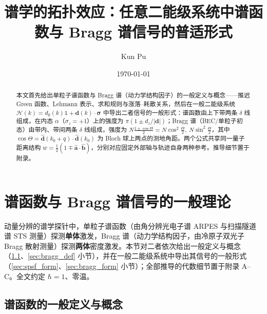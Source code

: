 \documentclass[onecolumn,aps,prl,superscriptaddress,longbibliography]{revtex4-2}
\begin{document}
	

\title{谱学的拓扑效应：任意二能级系统中谱函数与 Bragg 谱信号的普适形式}
\author{Kun Pu}
\date{\today}

\begin{abstract}
本文首先给出单粒子谱函数与 Bragg 谱（动力学结构因子）的一般定义与概念——推迟 Green 函数、Lehmann 表示、求和规则与涨落--耗散关系，然后在一般二能级系统 $\mathcal{H}(k) = d_0(k)\mathbb{1} + \mathbf{d}(k)\cdot\symbf{\sigma}$ 中导出二者信号的一般形式：谱函数由上下带两条 $\delta$ 线组成，在内态 $\alpha$（$\sigma_z = +1$）上的强度为 $\pi\left(1 \pm d_z/|\mathbf{d}|\right)$；Bragg 谱（BEC/单粒子初态）由带内、带间两条 $\delta$ 线组成，强度为 $N\frac{1\pm\cos\Theta}{2} = N\cos^2\frac{\Theta}{2},\ N\sin^2\frac{\Theta}{2}$，其中 $\cos\Theta = \hat{\mathbf{d}}(k_0+q)\cdot\hat{\mathbf{d}}(k_0)$ 为 Bloch 球上两点的测地角距。两个公式共享同一量子距离结构 $w = \frac{1}{2}(1 \mp \hat{\mathbf{a}}\cdot\hat{\mathbf{b}})$，分别对应固定外部轴与轨迹自身两种参考。推导细节置于附录。
\end{abstract}

\maketitle

\tableofcontents
\newpage

\section{谱函数与 Bragg 谱信号的一般理论}\label{sec:theory}

动量分辨的谱学探针中，单粒子谱函数（由角分辨光电子谱 ARPES 与扫描隧道谱 STS 测量）探测\textbf{单体}激发，Bragg 谱（动力学结构因子，由冷原子双光子 Bragg 散射测量）探测\textbf{两体}密度激发。本节对二者依次给出一般定义与概念（\ref{sec:spsf_def}、\ref{sec:bragg_def} 小节），并在一般二能级系统中导出其信号的一般形式（\ref{sec:spsf_form}、\ref{sec:bragg_form} 小节）；全部推导的代数细节置于附录 A--C。全文约定 $\hbar = 1$、零温。

\subsection{谱函数的一般定义与概念}\label{sec:spsf_def}
\end{document}
